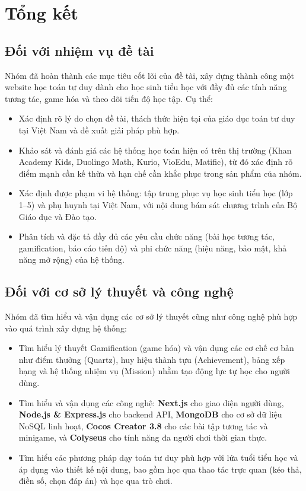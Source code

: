 \section{Tổng kết}

\subsection{Đối với nhiệm vụ đề tài}
Nhóm đã hoàn thành các mục tiêu cốt lõi của đề tài, xây dựng thành công một website học toán tư duy dành cho học sinh tiểu học với đầy đủ các tính năng tương tác, game hóa và theo dõi tiến độ học tập. Cụ thể:
\begin{itemize}
	\item Xác định rõ lý do chọn đề tài, thách thức hiện tại của giáo dục toán tư duy tại Việt Nam và đề xuất giải pháp phù hợp.
	\item Khảo sát và đánh giá các hệ thống học toán hiện có trên thị trường (Khan Academy Kids, Duolingo Math, Kurio, VioEdu, Matific), từ đó xác định rõ điểm mạnh cần kế thừa và hạn chế cần khắc phục trong sản phẩm của nhóm.
	\item Xác định được phạm vi hệ thống: tập trung phục vụ học sinh tiểu học (lớp 1--5) và phụ huynh tại Việt Nam, với nội dung bám sát chương trình của Bộ Giáo dục và Đào tạo.
	\item Phân tích và đặc tả đầy đủ các yêu cầu chức năng (bài học tương tác, gamification, báo cáo tiến độ) và phi chức năng (hiệu năng, bảo mật, khả năng mở rộng) của hệ thống.
\end{itemize}

\subsection{Đối với cơ sở lý thuyết và công nghệ}
Nhóm đã tìm hiểu và vận dụng các cơ sở lý thuyết cũng như công nghệ phù hợp vào quá trình xây dựng hệ thống:
\begin{itemize}
	\item Tìm hiểu lý thuyết Gamification (game hóa) và vận dụng các cơ chế cơ bản như điểm thưởng (Quartz), huy hiệu thành tựu (Achievement), bảng xếp hạng và hệ thống nhiệm vụ (Mission) nhằm tạo động lực tự học cho người dùng.
	\item Tìm hiểu và vận dụng các công nghệ: \textbf{Next.js} cho giao diện người dùng, \textbf{Node.js \& Express.js} cho backend API, \textbf{MongoDB} cho cơ sở dữ liệu NoSQL linh hoạt, \textbf{Cocos Creator 3.8} cho các bài tập tương tác và minigame, và \textbf{Colyseus} cho tính năng đa người chơi thời gian thực.
	\item Tìm hiểu các phương pháp dạy toán tư duy phù hợp với lứa tuổi tiểu học và áp dụng vào thiết kế nội dung, bao gồm học qua thao tác trực quan (kéo thả, điền số, chọn đáp án) và học qua trò chơi.
\end{itemize}

